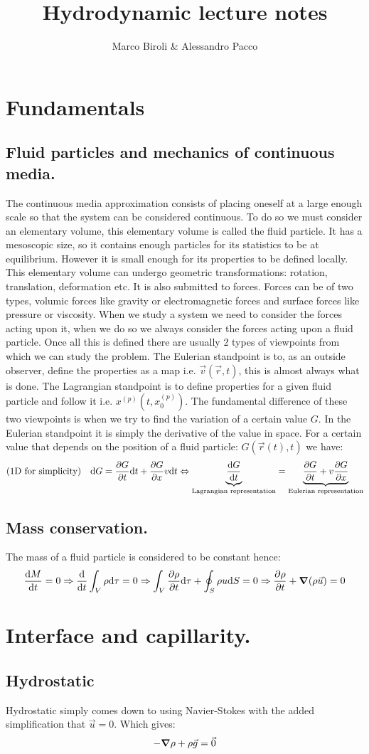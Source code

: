 \documentclass[10pt,a4paper]{book}
\title{Hydrodynamic lecture notes}
\author{Marco Biroli \& Alessandro Pacco}
\begin{document}
\maketitle

\chapter{Fundamentals}
\section{Fluid particles and mechanics of continuous media.}

The continuous media approximation consists of placing oneself at a large enough scale so that the system can be considered continuous. To do so we must consider an elementary volume, this elementary volume is called the fluid particle. It has a mesoscopic size, so it contains enough particles for its statistics to be at equilibrium. However it is small enough for its properties to be defined locally. This elementary volume can undergo geometric transformations: rotation, translation, deformation etc. It is also submitted to forces. Forces can be of two types, volumic forces like gravity or electromagnetic forces and surface forces like pressure or viscosity. When we study a system we need to consider the forces acting upon it, when we do so we always consider the forces acting upon a fluid particle. Once all this is defined there are usually 2 types of viewpoints from which we can study the problem. The Eulerian standpoint is to, as an outside observer, define the properties as a map i.e. $\vec{v}(\vec{r}, t)$, this is almost always what is done. The Lagrangian standpoint is to define properties for a given fluid particle and follow it i.e. $x^{(p)} (t, x_0^{(p)})$. The fundamental difference of these two viewpoints is when we try to find the variation of a certain value $G$. In the Eulerian standpoint it is simply the derivative of the value in space. For a certain value that depends on the position of a fluid particle: $G(\vec{r}(t), t)$ we have:
\[
(1 \text{D for simplicity}) \quad \dd G = \pdv{G}{t} \dd t + \pdv{G}{x} v \dd t \Leftrightarrow \underbrace{\dv{G}{t}}_{\text{Lagrangian representation}} = \underbrace{\pdv{G}{t} + v \pdv{G}{x}}_\text{Eulerian representation}
\]

\section{Mass conservation.}
The mass of a fluid particle is considered to be constant hence:
\[
\dv{M}{t} = 0 \Rightarrow \dv{}{t}\int_{V} \rho \dd \tau = 0 \Rightarrow \int_V \pdv{\rho}{t} \dd \tau + \oint_S \rho  u \dd S = 0 \Rightarrow \pdv{\rho}{t} + \grad (\rho \vec{u}) = 0
\]

\chapter{Interface and capillarity.}
\section{Hydrostatic}
Hydrostatic simply comes down to using Navier-Stokes with the added simplification that $\vec{u} = 0$. Which gives:
\[
-\grad \rho + \rho \vec{g} = \vec{0}
\]
\end{document}
